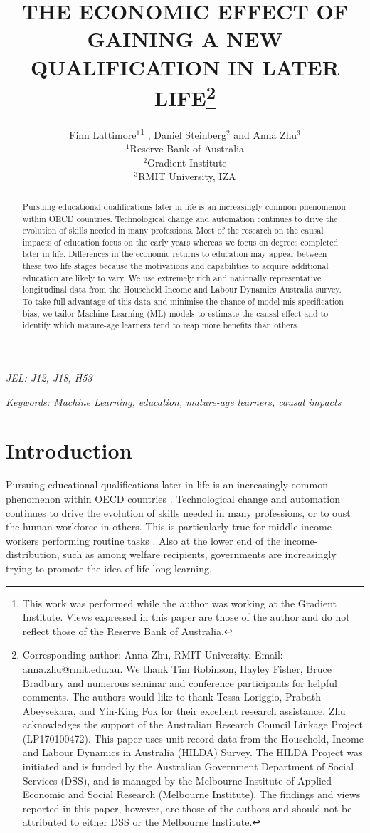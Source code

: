 \documentclass[12pt, a4paper]{article}
\title{THE ECONOMIC EFFECT OF GAINING A NEW QUALIFICATION IN LATER LIFE\thanks{\scriptsize{Corresponding author: Anna Zhu, RMIT University. Email: anna.zhu@rmit.edu.au. \newline \newline We thank Tim Robinson, Hayley Fisher, Bruce Bradbury and numerous seminar and conference participants for helpful comments. The authors would like to thank Tessa Loriggio, Prabath Abeysekara, and Yin-King Fok for their excellent research assistance. \newline \newline Zhu acknowledges the support of the Australian Research Council Linkage Project (LP170100472). This paper uses unit record data from the Household, Income and Labour Dynamics in Australia (HILDA) Survey. The HILDA Project was initiated and is funded by the Australian Government Department of Social Services (DSS), and is managed by the Melbourne Institute of Applied Economic and Social Research (Melbourne Institute). The findings and views reported in this paper, however, are those of the authors and should not be attributed to either DSS or the Melbourne Institute.}}} \vspace{0.2cm} \author{Finn Lattimore$^1$\thanks{\scriptsize{This work was performed while the author was working at the Gradient Institute. Views expressed in this paper are those of the author and do not reflect those of the Reserve Bank of Australia.}}\vspace{0.2cm} ,  Daniel Steinberg$^2$ and Anna Zhu$^3$ \\\small {$^1$Reserve Bank of Australia} \vspace{0.2cm} \\ {$^2$Gradient Institute} \vspace{0.2cm} \\ {$^3$RMIT University, IZA}}
\begin{document}

\maketitle


\begin{abstract}

Pursuing educational qualifications later in life is an increasingly common
  phenomenon within OECD countries. Technological change and automation
  continues to drive the evolution of skills needed in many professions. Most
  of the research on the causal impacts of education focus on the early years
  whereas we focus on degrees completed later in life. Differences in the
  economic returns to education may appear between these two life stages
  because the motivations and capabilities to acquire additional education are
  likely to vary. We use extremely rich and nationally representative
  longitudinal data from the Household Income and Labour Dynamics Australia
  survey. To take full advantage of this data and minimise the chance of model
  mis-specification bias, we tailor Machine Learning (ML) models to estimate
  the causal effect and to identify which mature-age learners tend to reap more
  benefits than others.

\end{abstract}


\emph{JEL: J12, J18, H53}

\emph{Keywords: Machine Learning, education, mature-age learners, causal impacts}


\clearpage
\onehalfspacing


\section{Introduction}

Pursuing educational qualifications later in life is an increasingly common phenomenon within OECD countries \citep{oecd2016}. Technological change and automation continues to drive the evolution of skills needed in many professions, or to oust the human workforce in others. This is particularly true for middle-income workers performing routine tasks \citep{autor2008,acemoglu2011}. Also at the lower end of the income-distribution, such as among welfare recipients, governments are increasingly trying to promote the idea of life-long learning. 
\end{document}
